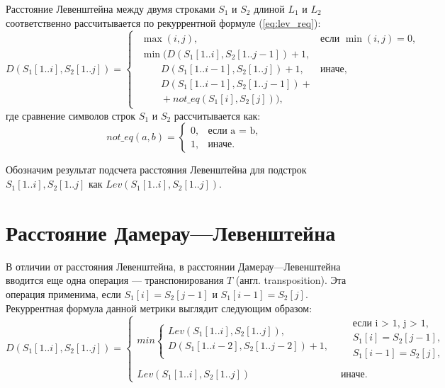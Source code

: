 Расстояние Левенштейна между двумя строками $S_1$ и $S_2$ длиной $L_1$ и $L_2$ соответственно рассчитывается по рекуррентной формуле (\ref{eq:lev_req}):
\small
\begin{equation}
	\label{eq:lev_req}
	D(S_1[1..i],S_2[1..j]) = 
	\begin{cases}
		\begin{array}{ll}
			\max(i,j), & \textrm{$\mbox{если }\min(i,j) = 0,$}\\
			\min(D(S_1[1..i], S_2[1.. j - 1])+1,\\
			\qquad D(S_1[1..i - 1], S_2[1..j]) + 1, &\textrm{$\mbox{иначе},$}\\
			\qquad D(S_1[1..i - 1], S_2[1..j - 1]) +\\
			\qquad + not\_eq(S_1[i],S_2[j])),
		\end{array}
	\end{cases}
\end{equation}
где сравнение символов строк $S_1$ и $S_2$ рассчитывается как:
\begin{equation}
	\label{eq:not\_eq}
	not\_eq(a, b) = \begin{cases}
		0, &\text{если a = b,}\\
		1, &\text{иначе.}
	\end{cases}
\end{equation}

\normalsize
Обозначим результат подсчета расстояния Левенштейна для подстрок $S_1[1..i],S_2[1..j]$ как 
$Lev(S_1[1..i],S_2[1..j])$.

\section{Расстояние Дамерау---Левенштейна}

В отличии от расстояния Левенштейна, в расстоянии Дамерау---Левенштейна вводится еще одна операция --- транспонирования $T$ (англ. transposition). Эта операция применима,  если $S_1[i] = S_2[j - 1]$ и $S_1[i - 1] = S_2[j]$. Рекуррентная формула данной метрики выглядит следующим образом:
\small
\begin{equation}
	\label{eq:dam_lev_req}
	D(S_1[1..i],S_2[1..j]) = 
	\begin{cases}
		min \begin{cases}
			Lev(S_1[1..i],S_2[1..j]),\\
			D(S_1[1..i - 2],S_2[1..j - 2]) + 1, \\
		\end{cases}
		& \begin{aligned}
			& \text{если i > 1, j > 1}, \\
			& S_1[i] = S_2[j - 1], \\
			& S_1[i - 1] = S_2[j], \\
		\end{aligned}\\
		Lev(S_1[1..i],S_2[1..j])
		& \text{иначе.}
	\end{cases}
\end{equation}
